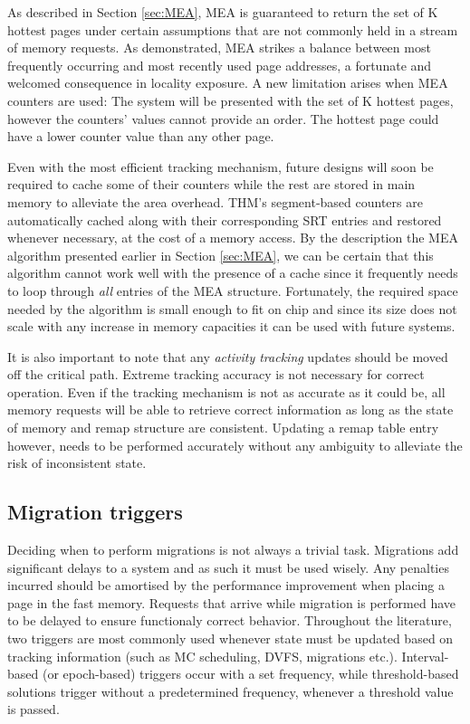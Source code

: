 As described in Section \ref{sec:MEA}, MEA is guaranteed to return the set of K hottest pages under certain assumptions that are not commonly held in a stream of memory requests. As demonstrated, MEA strikes a balance between most frequently occurring and most recently used page addresses, a fortunate and welcomed consequence in locality exposure. A new limitation arises when MEA counters are used: The system will be presented with the set of K hottest pages, however the counters' values cannot provide an order. The hottest page could have a lower counter value than any other page.

Even with the most efficient tracking mechanism, future designs will soon be required to cache some of their counters while the rest are stored in main memory to alleviate the area overhead. THM's segment-based counters are automatically cached along with their corresponding SRT entries and restored whenever necessary, at the cost of a memory access. By the description the MEA algorithm presented earlier in Section \ref{sec:MEA}, we can be certain that this algorithm cannot work well with the presence of a cache since it frequently needs to loop through \textit{all} entries of the MEA structure. Fortunately, the required space needed by the algorithm is small enough to fit on chip and since its size does not scale with any increase in memory capacities it can be used with future systems.

It is also important to note that any \textit{activity tracking} updates should be moved off the critical path. Extreme tracking accuracy is not necessary for correct operation. Even if the tracking mechanism is not as accurate as it could be, all memory requests will be able to retrieve correct information as long as the state of memory and remap structure are consistent. Updating a remap table entry however, needs to be performed accurately without any ambiguity to alleviate the risk of inconsistent state.

\subsection{Migration triggers}
Deciding when to perform migrations is not always a trivial task. Migrations add significant delays to a system and as such it must be used wisely. Any penalties incurred should be amortised by the performance improvement when placing a page in the fast memory. Requests that arrive while migration is performed have to be delayed to ensure functionaly correct behavior. Throughout the literature, two triggers are most commonly used whenever state must be updated based on tracking information (such as MC scheduling, DVFS, migrations etc.). Interval-based (or epoch-based) triggers occur with a set frequency, while threshold-based solutions trigger without a predetermined frequency, whenever a threshold value is passed. 

